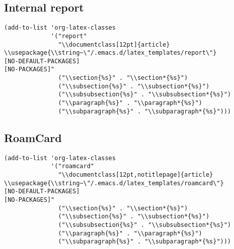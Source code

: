 \documentclass[12pt]{article}
\begin{document}
\subsection{Internal report}
\label{sec:org8be758c}
\begin{verbatim}
(add-to-list 'org-latex-classes
             '("report"
               "\\documentclass[12pt]{article}
\\usepackage{\\string~\"/.emacs.d/latex_templates/report\"}
[NO-DEFAULT-PACKAGES]
[NO-PACKAGES]"
               ("\\section{%s}" . "\\section*{%s}")
               ("\\subsection{%s}" . "\\subsection*{%s}")
               ("\\subsubsection{%s}" . "\\subsubsection*{%s}")
               ("\\paragraph{%s}" . "\\paragraph*{%s}")
               ("\\subparagraph{%s}" . "\\subparagraph*{%s}")))
\end{verbatim}

\subsection{RoamCard}
\label{sec:org66033ed}
\begin{verbatim}
(add-to-list 'org-latex-classes
             '("roamcard"
               "\\documentclass[12pt,notitlepage]{article}
\\usepackage{\\string~\"/.emacs.d/latex_templates/roamcard\"}
[NO-DEFAULT-PACKAGES]
[NO-PACKAGES]"
               ("\\section{%s}" . "\\section*{%s}")
               ("\\subsection{%s}" . "\\subsection*{%s}")
               ("\\subsubsection{%s}" . "\\subsubsection*{%s}")
               ("\\paragraph{%s}" . "\\paragraph*{%s}")
               ("\\subparagraph{%s}" . "\\subparagraph*{%s}")))
\end{verbatim}
\end{document}
